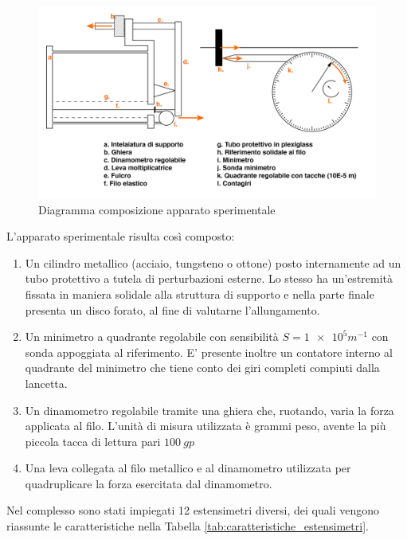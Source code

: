 \documentclass[a4paper,11pt,oneside]{article}
\begin{document}
\begin{figure}[h!]
    \centering
    \includegraphics[width=12.5cm]{ApparatoSperimentale.jpg}
    \caption{Diagramma composizione apparato sperimentale}
    \label{fig:apparato_sperimentale}
\end{figure}
L'apparato sperimentale risulta così composto:
\begin{enumerate}
    \item Un cilindro metallico (acciaio, tungsteno o ottone) posto internamente ad un tubo protettivo a tutela di perturbazioni esterne. Lo stesso ha un'estremità fissata in maniera solidale alla struttura di supporto e nella parte finale presenta un disco forato, al fine di valutarne l'allungamento.
    \item Un minimetro a quadrante regolabile con sensibilità $S=\num{1e5} \si{m^{-1}}$ con sonda appoggiata al riferimento. E' presente inoltre un contatore interno al quadrante del minimetro che tiene conto dei giri completi compiuti dalla lancetta.
    \item Un dinamometro regolabile tramite una ghiera che, ruotando, varia la forza applicata al filo. L'unità di misura utilizzata è grammi peso, avente la più piccola tacca di lettura pari $\SI{100}{gp}$
    \item Una leva collegata al filo metallico e al dinamometro utilizzata per quadruplicare la forza esercitata dal dinamometro.
\end{enumerate}
Nel complesso sono stati impiegati 12 estensimetri diversi, dei quali vengono riassunte le caratteristiche nella Tabella \ref{tab:caratteristiche_estensimetri}.
\end{document}
